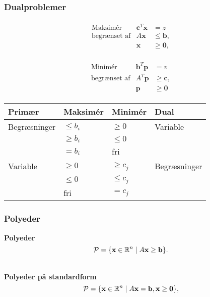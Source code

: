\begin{frame}
\frametitle{Dualproblemer}
\begin{align*}
\begin{array}{lrl}
\text{Maksimér}		&\textbf{c}^T\textbf{x}	& = z		\\
\text{begrænset af}	&A\textbf{x}	&\leq \mathbf{b},	\\
					&\mathbf{x}				&\geq \mathbf{0},
\end{array}
\end{align*}
%

%

\begin{align*}
\begin{array}{lrl}
\text{Minimér}		&\textbf{b}^T\textbf{p}	& = v			\\
\text{begrænset af}	&A^T \textbf{p}	&\geq \mathbf{c},	\\
					&\mathbf{p}				&\geq \mathbf{0}
\end{array}
\end{align*}
\begin{center}
\begin{tabular}{llll}
Primær  & Maksimér   & Minimér    & Dual         \\
\hline
Begræsninger & $\leq b_i$ & $\geq 0$   & Variable     \\
             & $\geq b_i$ & $\leq 0$   &              \\
             & $=b_i$     & fri        &            \\ 
\hline             
Variable     & $\geq 0$   & $\geq c_j$ & Begræsninger \\
             & $\leq 0$   & $\leq c_j$ &              \\
             & fri        & $=c_j$     &  
\end{tabular}
\end{center}
\end{frame}

\begin{frame}
\frametitle{Polyeder}
\textbf{Polyeder}
$$\mathcal{P} = \{\textbf{x} \in \R^n \mid A\mathbf{x}\geq \textbf{b}\}.$$
\\
$
\begin{array}{cc}
&

\end{array}
$
\\
\textbf{Polyeder på standardform} 
$$\mathcal{P}=\{ \mathbf{x} \in \R^n  \mid  A\mathbf{x}=\mathbf{b}, \mathbf{x} \geq \mathbf{0} \},$$
\end{frame}

